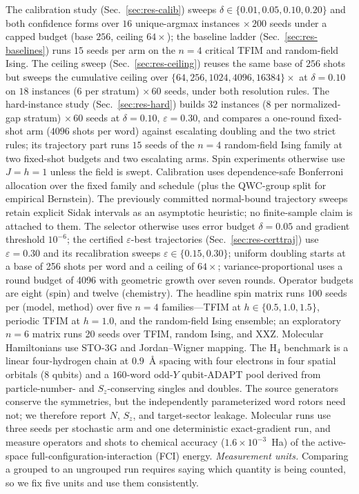 \documentclass[aps,pra,reprint,superscriptaddress,nofootinbib,floatfix]{revtex4-2}
\begin{document}
The calibration study (Sec.~\ref{sec:res-calib}) sweeps $\delta\in\{0.01,0.05,0.10,0.20\}$ and both confidence forms over $16$ unique-argmax instances $\times\,200$ seeds under a capped budget (base $256$, ceiling $64\times$); the baseline ladder (Sec.~\ref{sec:res-baselines}) runs $15$ seeds per arm on the $n=4$ critical TFIM and random-field Ising. The ceiling sweep (Sec.~\ref{sec:res-ceiling}) reuses the same base of $256$ shots but sweeps the cumulative ceiling over $\{64,256,1024,4096,16384\}\times$ at $\delta=0.10$ on $18$ instances ($6$ per stratum) $\times\,60$ seeds, under both resolution rules. The hard-instance study (Sec.~\ref{sec:res-hard}) builds $32$ instances ($8$ per normalized-gap stratum) $\times\,60$ seeds at $\delta=0.10$, $\varepsilon=0.30$, and compares a one-round fixed-shot arm ($4096$ shots per word) against escalating doubling and the two strict rules; its trajectory part runs $15$ seeds of the $n=4$ random-field Ising family at two fixed-shot budgets and two escalating arms. Spin experiments otherwise use $J=h=1$ unless the field is swept. Calibration uses dependence-safe Bonferroni allocation over the fixed family and schedule (plus the QWC-group split for empirical Bernstein). The previously committed normal-bound trajectory sweeps retain explicit Sidak intervals as an asymptotic heuristic; no finite-sample claim is attached to them. The selector otherwise uses error budget $\delta=0.05$ and gradient threshold $10^{-6}$; the certified $\varepsilon$-best trajectories (Sec.~\ref{sec:res-certtraj}) use $\varepsilon=0.30$ and its recalibration sweeps $\varepsilon\in\{0.15,0.30\}$; uniform doubling starts at a base of 256 shots per word and a ceiling of $64\times$; variance-proportional uses a round budget of 4096 with geometric growth over seven rounds. Operator budgets are eight (spin) and twelve (chemistry). The headline spin matrix runs 100 seeds per (model, method) over five $n=4$ families---TFIM at $h\in\{0.5,1.0,1.5\}$, periodic TFIM at $h=1.0$, and the random-field Ising ensemble; an exploratory $n=6$ matrix runs 20 seeds over TFIM, random Ising, and XXZ. Molecular Hamiltonians use STO-3G and Jordan--Wigner mapping. The H$_4$ benchmark is a linear four-hydrogen chain at $0.9$~\AA{} spacing with four electrons in four spatial orbitals ($8$ qubits) and a $160$-word odd-$Y$ qubit-ADAPT pool derived from particle-number- and $S_z$-conserving singles and doubles. The source generators conserve the symmetries, but the independently parameterized word rotors need not; we therefore report $N$, $S_z$, and target-sector leakage. Molecular runs use three seeds per stochastic arm and one deterministic exact-gradient run, and measure operators and shots to chemical accuracy ($1.6\times10^{-3}$~Ha) of the active-space full-configuration-interaction (FCI) energy. \emph{Measurement units.} Comparing a grouped to an ungrouped run requires saying which quantity is being counted, so we fix five units and use them consistently.
\end{document}
